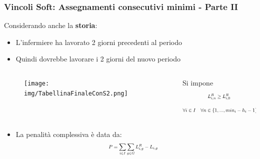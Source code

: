 \documentclass[xcolor={dvipsnames, table}]{beamer}
\newcommand\scalemath[2]{\scalebox{#1}{\mbox{\ensuremath{\displaystyle #2}}}}
\begin{document}
%
\begin{frame}
	\frametitle{Vincoli Soft: Assegnamenti consecutivi minimi - Parte II}
	Considerando anche la \textbf{storia}:
	\begin{itemize}
	\item L'infermiere ha lavorato 2 giorni precedenti al periodo
	\item Quindi dovrebbe lavorare i 2 giorni del nuovo periodo
	\end{itemize}
	\begin{columns}
	\begin{column}{0.70\textwidth}
	\begin{figure}[h!]
	\begin{center}
  	\texttt{[image: img/TabellinaFinaleConS2.png]}
	\end{center}
	\end{figure}
	\end{column}
	\begin{column}{0.40\textwidth}
	\begin{block}{Si impone}
	\begin{equation*}
	\scalemath{0.7}{
	\begin{aligned}
	L_{i, n}^R \geq L_{i, 0}^R \\
	\end{aligned}
	}
	\end{equation*}
	\begin{equation*}
	\scalemath{0.7}{
	\begin{aligned}
	\forall i \in I ~~~ \forall n \in \{1,...,min_i - h_i - 1\} \\
	\end{aligned}
	}
	\end{equation*}
	\end{block}
	\end{column}
	\end{columns}
	\begin{itemize}
	\item La penalità complessiva è data da:
	\begin{equation*}
	\scalemath{0.7}{
	\begin{aligned}
	P &= \sum_{i \in I} \sum_{g \in G} L_{i, g}^R - L_{i, g}
	\end{aligned}
	}
	\end{equation*}
	\end{itemize}
\end{frame}
	
	
	
	
	
\end{document}
